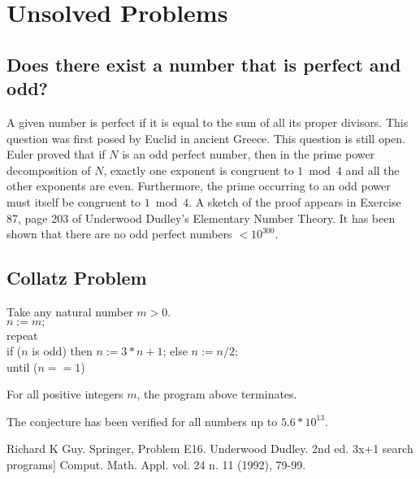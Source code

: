 \section{Unsolved Problems}

\subsection{Does there exist a number that is perfect and odd?}

    A given number is perfect if it is equal to the sum of all its proper
    divisors. This question was first posed by Euclid in ancient Greece.
    This question is still open.  Euler proved that if  $N$  is an odd
    perfect number, then in the prime power decomposition of $N$, exactly
    one exponent is congruent to $1 \bmod 4$ and all the other exponents are
    even. Furthermore, the prime occurring to an odd power must itself be
    congruent to $1 \bmod 4$.  A sketch of the proof appears in Exercise 87,
    page 203 of Underwood Dudley's Elementary Number Theory.
    It has been shown that there are no odd perfect numbers $< 10^{300}$.


\subsection{Collatz Problem}


       Take any natural number $m > 0$.\\
       $n:=m;$\\
       repeat\\
             \hspace{1cm}  if ($n$ is odd) then $n:=3*n+1$; else $n:=n/2$;\\
       until ($n==1$)\\

\begin{conj}  For all positive integers $m$, the program above terminates.
\end{conj}

The conjecture has been verified for all numbers up to $5.6 * 10^{13}$.



\Ref


     {Richard K Guy.}
     {Springer, Problem E16.}
     {Underwood Dudley.}
     {2nd ed.}
 {3x+1 search programs}]
 {Comput. Math. Appl.}
{vol. 24 n. 11 (1992), 79-99.}


